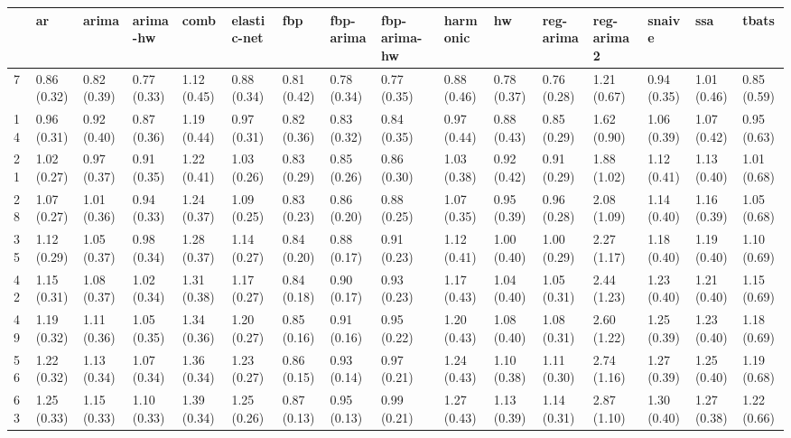 \begin{tabular}{llllllllllllllll}
\toprule
{} &           ar &        arima &     arima-hw &         comb &  elastic-net &          fbp &    fbp-arima & fbp-arima-hw &     harmonic &           hw &    reg-arima &   reg-arima2 &       snaive &          ssa &        tbats \\
\midrule
7   &  0.86 (0.32) &  0.82 (0.39) &  0.77 (0.33) &  1.12 (0.45) &  0.88 (0.34) &  0.81 (0.42) &  0.78 (0.34) &  0.77 (0.35) &  0.88 (0.46) &  0.78 (0.37) &  0.76 (0.28) &  1.21 (0.67) &  0.94 (0.35) &  1.01 (0.46) &  0.85 (0.59) \\
14  &  0.96 (0.31) &  0.92 (0.40) &  0.87 (0.36) &  1.19 (0.44) &  0.97 (0.31) &  0.82 (0.36) &  0.83 (0.32) &  0.84 (0.35) &  0.97 (0.44) &  0.88 (0.43) &  0.85 (0.29) &  1.62 (0.90) &  1.06 (0.39) &  1.07 (0.42) &  0.95 (0.63) \\
21  &  1.02 (0.27) &  0.97 (0.37) &  0.91 (0.35) &  1.22 (0.41) &  1.03 (0.26) &  0.83 (0.29) &  0.85 (0.26) &  0.86 (0.30) &  1.03 (0.38) &  0.92 (0.42) &  0.91 (0.29) &  1.88 (1.02) &  1.12 (0.41) &  1.13 (0.40) &  1.01 (0.68) \\
28  &  1.07 (0.27) &  1.01 (0.36) &  0.94 (0.33) &  1.24 (0.37) &  1.09 (0.25) &  0.83 (0.23) &  0.86 (0.20) &  0.88 (0.25) &  1.07 (0.35) &  0.95 (0.39) &  0.96 (0.28) &  2.08 (1.09) &  1.14 (0.40) &  1.16 (0.39) &  1.05 (0.68) \\
35  &  1.12 (0.29) &  1.05 (0.37) &  0.98 (0.34) &  1.28 (0.37) &  1.14 (0.27) &  0.84 (0.20) &  0.88 (0.17) &  0.91 (0.23) &  1.12 (0.41) &  1.00 (0.40) &  1.00 (0.29) &  2.27 (1.17) &  1.18 (0.40) &  1.19 (0.40) &  1.10 (0.69) \\
42  &  1.15 (0.31) &  1.08 (0.37) &  1.02 (0.34) &  1.31 (0.38) &  1.17 (0.27) &  0.84 (0.18) &  0.90 (0.17) &  0.93 (0.23) &  1.17 (0.43) &  1.04 (0.40) &  1.05 (0.31) &  2.44 (1.23) &  1.23 (0.40) &  1.21 (0.40) &  1.15 (0.69) \\
49  &  1.19 (0.32) &  1.11 (0.36) &  1.05 (0.35) &  1.34 (0.36) &  1.20 (0.27) &  0.85 (0.16) &  0.91 (0.16) &  0.95 (0.22) &  1.20 (0.43) &  1.08 (0.40) &  1.08 (0.31) &  2.60 (1.22) &  1.25 (0.39) &  1.23 (0.40) &  1.18 (0.69) \\
56  &  1.22 (0.32) &  1.13 (0.34) &  1.07 (0.34) &  1.36 (0.34) &  1.23 (0.27) &  0.86 (0.15) &  0.93 (0.14) &  0.97 (0.21) &  1.24 (0.43) &  1.10 (0.38) &  1.11 (0.30) &  2.74 (1.16) &  1.27 (0.39) &  1.25 (0.40) &  1.19 (0.68) \\
63  &  1.25 (0.33) &  1.15 (0.33) &  1.10 (0.33) &  1.39 (0.34) &  1.25 (0.26) &  0.87 (0.13) &  0.95 (0.13) &  0.99 (0.21) &  1.27 (0.43) &  1.13 (0.39) &  1.14 (0.31) &  2.87 (1.10) &  1.30 (0.40) &  1.27 (0.38) &  1.22 (0.66) \\

\end{tabular}
